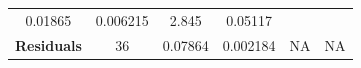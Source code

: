 \documentclass[]{article}
\begin{document}
\begin{longtable}[]{@{}cccccc@{}}
\begin{minipage}[t]{0.10\columnwidth}
0.01865\strut
\end{minipage} & \begin{minipage}[t]{0.12\columnwidth}\centering\strut
0.006215\strut
\end{minipage} & \begin{minipage}[t]{0.12\columnwidth}\centering\strut
2.845\strut
\end{minipage} & \begin{minipage}[t]{0.12\columnwidth}\centering\strut
0.05117\strut
\end{minipage}\tabularnewline
\begin{minipage}[t]{0.19\columnwidth}\centering\strut
\textbf{Residuals}\strut
\end{minipage} & \begin{minipage}[t]{0.06\columnwidth}\centering\strut
36\strut
\end{minipage} & \begin{minipage}[t]{0.10\columnwidth}\centering\strut
0.07864\strut
\end{minipage} & \begin{minipage}[t]{0.12\columnwidth}\centering\strut
0.002184\strut
\end{minipage} & \begin{minipage}[t]{0.12\columnwidth}\centering\strut
NA\strut
\end{minipage} & \begin{minipage}[t]{0.12\columnwidth}\centering\strut
NA\strut
\end{minipage}\tabularnewline
\bottomrule
\end{longtable}
\end{document}
